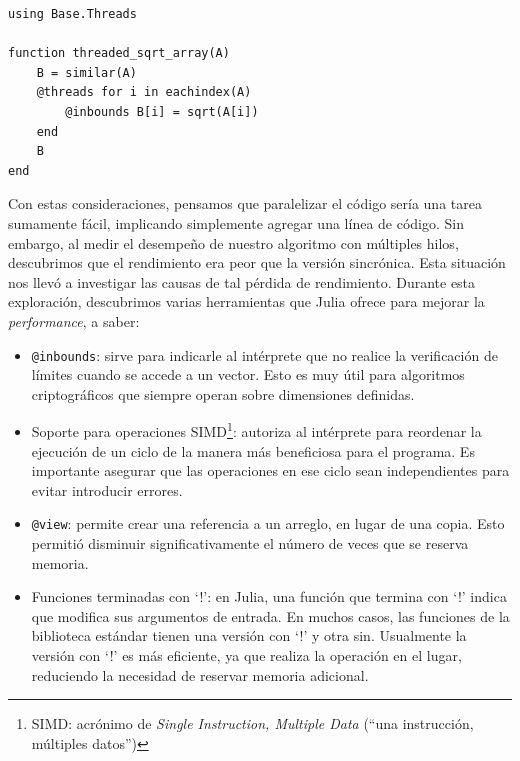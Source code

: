 \documentclass[11pt]{article}
\newcommand{\english}[1]{\textit{#1}}
\begin{document}
\begin{listing}[H]
\begin{verbatim}
using Base.Threads

function threaded_sqrt_array(A)
    B = similar(A)
    @threads for i in eachindex(A)
        @inbounds B[i] = sqrt(A[i])
    end
    B
end
\end{verbatim}
\caption{Ejemplo de utilización de las macros \lstinline{@threads} y \lstinline{@inbounds}}
\label{code:aes:julia_multithreading}
\end{listing}


Con estas consideraciones, pensamos que paralelizar el código sería una tarea sumamente fácil, implicando simplemente agregar una línea de código. Sin embargo, al medir el desempeño de nuestro algoritmo con múltiples hilos, descubrimos que el rendimiento era peor que la versión sincrónica. Esta situación nos llevó a investigar las causas de tal pérdida de rendimiento. Durante esta exploración, descubrimos varias herramientas que Julia ofrece para mejorar la \english{performance}, a saber:

\begin{itemize}
    \item \lstinline{@inbounds}: sirve para indicarle al intérprete que no realice la verificación de límites cuando se accede a un vector. Esto es muy útil para algoritmos criptográficos que siempre operan sobre dimensiones definidas.
    \item Soporte para operaciones SIMD\footnote{SIMD: acrónimo de \english{Single Instruction, Multiple Data} (``una instrucción, múltiples datos'')}: autoriza al intérprete para reordenar la ejecución de un ciclo de la manera más beneficiosa para el programa. Es importante asegurar que las operaciones en ese ciclo sean independientes para evitar introducir errores.
    \item \lstinline{@view}: permite crear una referencia a un arreglo, en lugar de una copia. Esto permitió disminuir significativamente el número de veces que se reserva memoria.
    \item Funciones terminadas con `!': en Julia, una función que termina con `!' indica que modifica sus argumentos de entrada. En muchos casos, las funciones de la biblioteca estándar tienen una versión con `!' y otra sin. Usualmente la versión con `!' es más eficiente, ya que realiza la operación en el lugar, reduciendo la necesidad de reservar memoria adicional.
\end{itemize}
\end{document}
